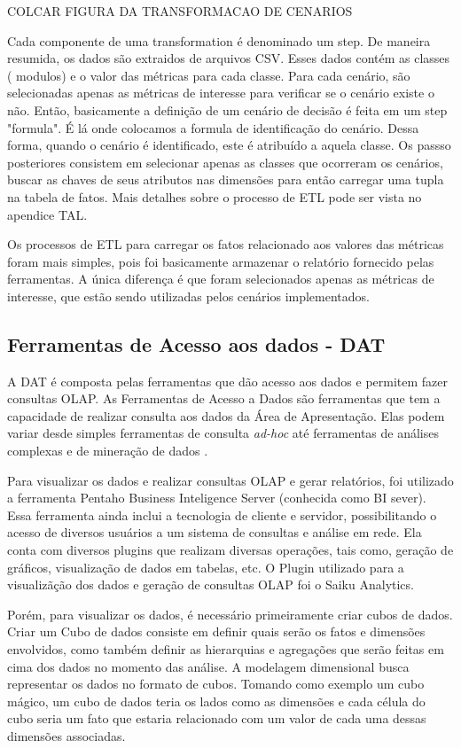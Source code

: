 COLCAR FIGURA DA TRANSFORMACAO DE CENARIOS


Cada componente de uma transformation é denominado um step. De maneira resumida, os dados são extraidos de arquivos CSV. Esses dados contém as classes ( modulos) e o valor das métricas para cada classe. Para cada cenário, são selecionadas apenas as métricas de interesse para verificar se o cenário existe o não. Então, basicamente a definição de um cenário de decisão é feita em um step "formula". É lá onde colocamos a formula de identificação do cenário. Dessa forma, quando o cenário é identificado, este é atribuído a aquela classe. Os passso posteriores consistem em selecionar apenas as classes que ocorreram os cenários, buscar as chaves de seus atributos nas dimensões para então carregar uma tupla na tabela de fatos. Mais detalhes sobre o processo de ETL pode ser vista no apendice TAL.


Os processos de ETL para carregar os fatos relacionado aos valores das métricas foram mais simples, pois foi basicamente armazenar o relatório fornecido pelas ferramentas. A única diferença é que foram selecionados apenas as métricas de interesse, que estão sendo utilizadas pelos cenários implementados.

\subsection{Ferramentas de Acesso aos dados - DAT}

A DAT é composta pelas ferramentas que dão acesso aos dados e permitem fazer consultas OLAP. As Ferramentas de Acesso a Dados são ferramentas que tem a capacidade de realizar consulta aos dados da Área de Apresentação. Elas podem variar desde simples ferramentas de consulta \emph{ad-hoc} até ferramentas de análises complexas e de mineração de dados \cite{kimball2002}.


Para visualizar os dados e realizar consultas OLAP e gerar relatórios, foi utilizado a ferramenta Pentaho Business Inteligence Server (conhecida como BI sever). Essa ferramenta ainda inclui a tecnologia de cliente e servidor, possibilitando o acesso de diversos usuários a um sistema de consultas e análise em rede. Ela conta com diversos plugins que realizam diversas operações, tais como, geração de gráficos, visualização de dados em tabelas, etc. O Plugin utilizado para a visualizãção dos dados e geração de consultas OLAP foi o Saiku Analytics.

Porém, para visualizar os dados, é necessário primeiramente criar cubos de dados. Criar um Cubo de dados consiste em definir quais serão os fatos e dimensões envolvidos, como também definir as hierarquias e agregações que serão feitas em cima dos dados no momento das análise. A modelagem dimensional busca representar os dados no formato de cubos. Tomando como exemplo um cubo mágico, um cubo de dados teria os lados como as dimensões e cada célula do cubo seria um fato que estaria relacionado com um valor de cada uma dessas dimensões associadas.


